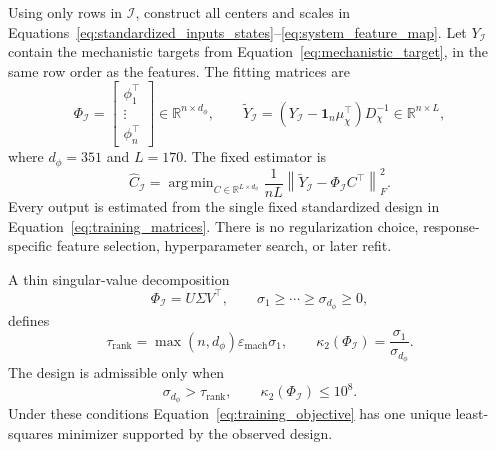 \documentclass[a4paper,fleqn]{cas-sc}
\DeclareMathOperator*{\argminop}{arg\,min}
\newcommand{\R}{\mathbb{R}}
\begin{document}
Using only rows in $\mathcal I$, construct all centers and scales in Equations~\eqref{eq:standardized_inputs_states}--\eqref{eq:system_feature_map}. Let $Y_{\mathcal I}$ contain the mechanistic targets from Equation~\eqref{eq:mechanistic_target}, in the same row order as the features. The fitting matrices are
\begin{equation}
\label{eq:training_matrices}
\Phi_{\mathcal I}=\begin{bmatrix}\phi_1^\top\\\vdots\\\phi_n^\top\end{bmatrix}\in\R^{n\times d_\phi},
\qquad
\widetilde Y_{\mathcal I}=(Y_{\mathcal I}-\mathbf1_n\mu_\chi^\top)D_\chi^{-1}\in\R^{n\times L},
\end{equation}
where $d_\phi=351$ and $L=170$. The fixed estimator is
\begin{equation}
\label{eq:training_objective}
\widehat C_{\mathcal I}=\argminop_{C\in\R^{L\times d_\phi}}
\frac{1}{nL}\left\|\widetilde Y_{\mathcal I}-\Phi_{\mathcal I}C^\top\right\|_F^2.
\end{equation}
Every output is estimated from the single fixed standardized design in Equation~\eqref{eq:training_matrices}. There is no regularization choice, response-specific feature selection, hyperparameter search, or later refit.

A thin singular-value decomposition
\begin{equation}
\label{eq:design_svd}
\Phi_{\mathcal I}=U\Sigma V^\top,
\qquad \sigma_1\geq\cdots\geq\sigma_{d_\phi}\geq0,
\end{equation}
defines
\begin{equation}
\label{eq:design_rank_condition}
\tau_{\mathrm{rank}}=\max(n,d_\phi)\varepsilon_{\mathrm{mach}}\sigma_1,
\qquad
\kappa_2(\Phi_{\mathcal I})=\frac{\sigma_1}{\sigma_{d_\phi}}.
\end{equation}
The design is admissible only when
\begin{equation}
\label{eq:design_acceptance}
\sigma_{d_\phi}>\tau_{\mathrm{rank}},
\qquad
\kappa_2(\Phi_{\mathcal I})\leq10^8.
\end{equation}
Under these conditions Equation~\eqref{eq:training_objective} has one unique least-squares minimizer supported by the observed design.
\end{document}
